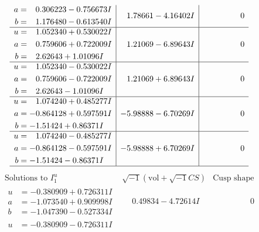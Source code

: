 \documentclass[1p]{elsarticle_modified}
\theoremstyle{definition}
\newcommand{\I}{\sqrt{-1}}
\begin{document}
$$\begin{array}{c|c|c}
\begin{aligned}
a &= \phantom{-}0.306223 - 0.756673 I \\
b &= \phantom{-}1.176480 - 0.613540 I\end{aligned}
 & \phantom{-}1.78661 - 4.16402 I & \phantom{-0.000000 } 0 \\ \hline\begin{aligned}
u &= \phantom{-}1.052340 + 0.530022 I \\
a &= \phantom{-}0.759606 + 0.722009 I \\
b &= \phantom{-}2.62643 + 1.01096 I\end{aligned}
 & \phantom{-}1.21069 - 6.89643 I & \phantom{-0.000000 } 0 \\ \hline\begin{aligned}
u &= \phantom{-}1.052340 - 0.530022 I \\
a &= \phantom{-}0.759606 - 0.722009 I \\
b &= \phantom{-}2.62643 - 1.01096 I\end{aligned}
 & \phantom{-}1.21069 + 6.89643 I & \phantom{-0.000000 } 0 \\ \hline\begin{aligned}
u &= \phantom{-}1.074240 + 0.485277 I \\
a &= -0.864128 + 0.597591 I \\
b &= -1.51424 + 0.86371 I\end{aligned}
 & -5.98888 - 6.70269 I & \phantom{-0.000000 } 0 \\ \hline\begin{aligned}
u &= \phantom{-}1.074240 - 0.485277 I \\
a &= -0.864128 - 0.597591 I \\
b &= -1.51424 - 0.86371 I\end{aligned}
 & -5.98888 + 6.70269 I & \phantom{-0.000000 } 0\\
 \hline 
 \end{array}$$\newpage$$\begin{array}{c|c|c}  
\text{Solutions to }I^u_{1}& \I (\text{vol} + \sqrt{-1}CS) & \text{Cusp shape}\\
 \hline 
\begin{aligned}
u &= -0.380909 + 0.726311 I \\
a &= -1.073540 + 0.909998 I \\
b &= -1.047390 - 0.527334 I\end{aligned}
 & \phantom{-}0.49834 - 4.72614 I & \phantom{-0.000000 } 0 \\ \hline\begin{aligned}
u &= -0.380909 - 0.726311 I \\

\end{aligned}
\end{array}$$
\end{document}
